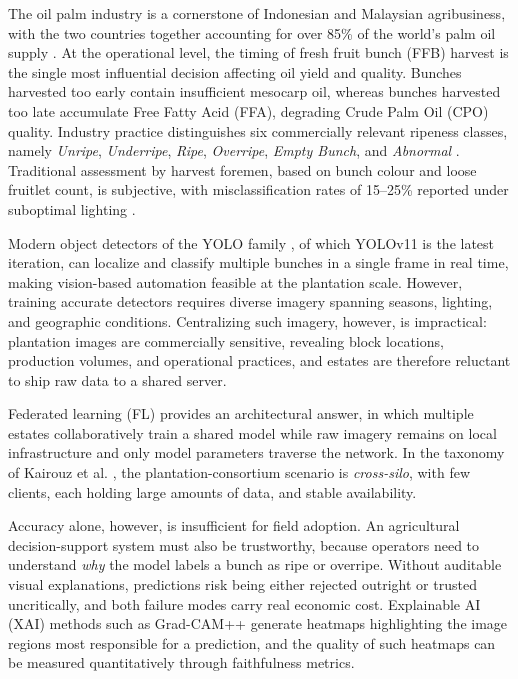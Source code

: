 \documentclass[9pt,twocolumn]{extarticle}
\begin{document}
The oil palm industry is a cornerstone of Indonesian and Malaysian agribusiness, with the two countries together accounting for over 85\% of the world's palm oil supply \cite{usda2024}. At the operational level, the timing of fresh fruit bunch (FFB) harvest is the single most influential decision affecting oil yield and quality. Bunches harvested too early contain insufficient mesocarp oil, whereas bunches harvested too late accumulate Free Fatty Acid (FFA), degrading Crude Palm Oil (CPO) quality. Industry practice distinguishes six commercially relevant ripeness classes, namely \emph{Unripe}, \emph{Underripe}, \emph{Ripe}, \emph{Overripe}, \emph{Empty Bunch}, and \emph{Abnormal} \cite{junos2022}. Traditional assessment by harvest foremen, based on bunch colour and loose fruitlet count, is subjective, with misclassification rates of 15--25\% reported under suboptimal lighting \cite{sabri2017}.

Modern object detectors of the YOLO family \cite{redmon2016}, of which YOLOv11 \cite{khanam2024} is the latest iteration, can localize and classify multiple bunches in a single frame in real time, making vision-based automation feasible at the plantation scale. However, training accurate detectors requires diverse imagery spanning seasons, lighting, and geographic conditions. Centralizing such imagery, however, is impractical: plantation images are commercially sensitive, revealing block locations, production volumes, and operational practices, and estates are therefore reluctant to ship raw data to a shared server.

Federated learning (FL) \cite{mcmahan2017} provides an architectural answer, in which multiple estates collaboratively train a shared model while raw imagery remains on local infrastructure and only model parameters traverse the network. In the taxonomy of Kairouz et al. \cite{kairouz2021}, the plantation-consortium scenario is \emph{cross-silo}, with few clients, each holding large amounts of data, and stable availability.

Accuracy alone, however, is insufficient for field adoption. An agricultural decision-support system must also be trustworthy, because operators need to understand \emph{why} the model labels a bunch as ripe or overripe. Without auditable visual explanations, predictions risk being either rejected outright or trusted uncritically, and both failure modes carry real economic cost. Explainable AI (XAI) methods such as Grad-CAM++ \cite{chattopadhyay2018} generate heatmaps highlighting the image regions most responsible for a prediction, and the quality of such heatmaps can be measured quantitatively through faithfulness metrics.
\end{document}
